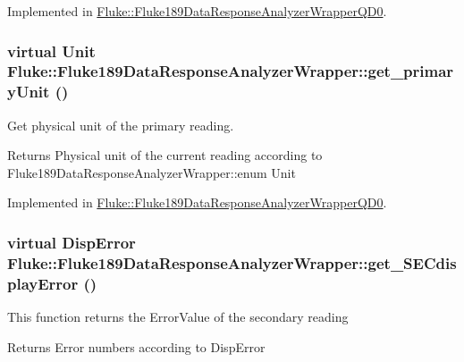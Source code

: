 Implemented in \hyperlink{classFluke_1_1Fluke189DataResponseAnalyzerWrapperQD0_acffb9af55e2d690060ef210977c3c933}{Fluke::Fluke189DataResponseAnalyzerWrapperQD0}.\hypertarget{classFluke_1_1Fluke189DataResponseAnalyzerWrapper_a81fd0f497095dba37f2a614bd35426db}{
\subsubsection[{get\_\-primaryUnit}]{\setlength{\rightskip}{0pt plus 5cm}virtual {\bf Unit} Fluke::Fluke189DataResponseAnalyzerWrapper::get\_\-primaryUnit ()}}
\label{classFluke_1_1Fluke189DataResponseAnalyzerWrapper_a81fd0f497095dba37f2a614bd35426db}
Get physical unit of the primary reading. \begin{DoxyReturn}{Returns}
Physical unit of the current reading according to Fluke189DataResponseAnalyzerWrapper::enum Unit 
\end{DoxyReturn}


Implemented in \hyperlink{classFluke_1_1Fluke189DataResponseAnalyzerWrapperQD0_af71dd62d9f81866ad3cb96c580754329}{Fluke::Fluke189DataResponseAnalyzerWrapperQD0}.\hypertarget{classFluke_1_1Fluke189DataResponseAnalyzerWrapper_a28c8a2bcca43f33e1b1becf9d5ffa76c}{
\subsubsection[{get\_\-SECdisplayError}]{\setlength{\rightskip}{0pt plus 5cm}virtual {\bf DispError} Fluke::Fluke189DataResponseAnalyzerWrapper::get\_\-SECdisplayError ()}}
\label{classFluke_1_1Fluke189DataResponseAnalyzerWrapper_a28c8a2bcca43f33e1b1becf9d5ffa76c}
This function returns the ErrorValue of the secondary reading \begin{DoxyReturn}{Returns}
Error numbers according to DispError 
\end{DoxyReturn}


